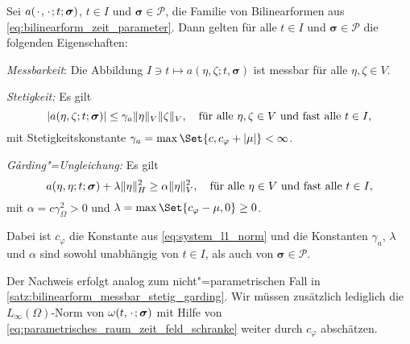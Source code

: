 \documentclass[../main.tex]{subfiles}
\begin{document}
\begin{Satz}
\label{satz:parametrische_bilinearform_messbar_stetig_garding}
    Sei $a({\mkern2mu\cdot\mkern2mu}, {\mkern2mu\cdot\mkern2mu}; t; \bm\sigma)$, $t \in I$ und $\bm\sigma \in \mathcal P$, die Familie von Bilinearformen aus \cref{eq:bilinearform_zeit_parameter}.
    Dann gelten für alle $t \in I$ und $\bm\sigma \in \mathcal P$ die folgenden Eigenschaften:
    \begin{thmenumerate}
        \item\label{satz:parametrische_bilinearform_messbar_stetig_garding:messbar}
        \emph{Messbarkeit}: Die Abbildung $I \ni t \mapsto a(\eta, \zeta; t, \bm\sigma)$ ist messbar für alle $\eta, \zeta \in V$.
        \item\label{satz:parametrische_bilinearform_messbar_stetig_garding:stetig}
        \emph{Stetigkeit:} Es gilt
        \begin{equation}
            \label{eq:parametrische_bilinearform_messbar_stetig_garding:stetig}
            \abs{a(\eta, \zeta; t; \bm\sigma)} \leq \gamma_{a} \norm{\eta}_{V} \norm{\zeta}_{V}, \quad \fa \eta, \zeta \in V \text{ und fast alle } t \in I,
        \end{equation}
        mit Stetigkeitskonstante $\gamma_{a} = \max\Set{c, c_{\varphi} + \abs{\mu}} < \infty$.
        \item\label{satz:parametrische_bilinearform_messbar_stetig_garding:garding}
        \emph{G\aa{}rding"=Ungleichung:} Es gilt
        \begin{equation}
            \label{eq:parametrische_bilinearform_messbar_stetig_garding:garding}
            a(\eta, \eta; t; \bm\sigma) + \lambda \norm{\eta}_{H}^{2} \geq \alpha \norm{\eta}_{V}^{2}, \quad \fa \eta \in V \text{ und fast alle } t \in I,
        \end{equation}
        mit $\alpha = c \gamma_{\Omega}^{2} > 0$ und $\lambda = \max\Set{c_{\varphi} - \mu, 0} \geq 0$.
    \end{thmenumerate}
    Dabei ist $c_{\varphi}$ die Konstante aus \cref{eq:system_l1_norm} und die Konstanten $\gamma_{a}$, $\lambda$ und $\alpha$ sind sowohl unabhängig von $t \in I$, als auch von $\bm\sigma \in \mathcal P$.

    \begin{Beweis}
        Der Nachweis erfolgt analog zum nicht"=parametrischen Fall in \cref{satz:bilinearform_messbar_stetig_garding}.
        Wir müssen zusätzlich lediglich die $L_{\infty}(\Omega)$-Norm von $\omega(t, {\mkern2mu\cdot\mkern2mu}; \bm\sigma)$ mit Hilfe von \cref{eq:parametrisches_raum_zeit_feld_schranke} weiter durch $c_{\varphi}$ abschätzen.
    \end{Beweis}
\end{Satz}
\end{document}
